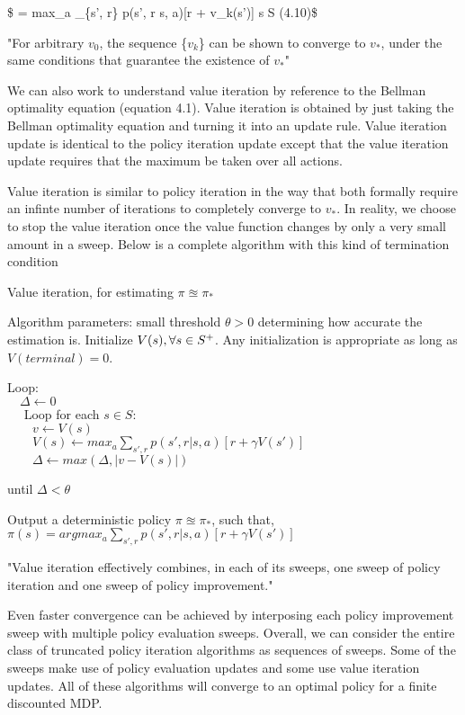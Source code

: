 \documentclass[11pt]{article}
\begin{document}
\$ \quad = max\_a \sum\_\{s', r\} p(s', r \textbar{} s, a){[}r +
\gamma v\_k(s'){]} \quad \forall \space s \in S \quad \quad (4.10)\$

"For arbitrary \(v_0\), the sequence \{\(v_k\)\} can be shown to
converge to \(v_*\), under the same conditions that guarantee the
existence of \(v_*\)"

    We can also work to understand value iteration by reference to the
Bellman optimality equation (equation 4.1). Value iteration is obtained
by just taking the Bellman optimality equation and turning it into an
update rule. Value iteration update is identical to the policy iteration
update except that the value iteration update requires that the maximum
be taken over all actions.

    Value iteration is similar to policy iteration in the way that both
formally require an infinte number of iterations to completely converge
to \(v_*\). In reality, we choose to stop the value iteration once the
value function changes by only a very small amount in a sweep. Below is
a complete algorithm with this kind of termination condition

    Value iteration, for estimating \(\pi \approxeq \pi_*\)

Algorithm parameters: small threshold \(\theta > 0\) determining how
accurate the estimation is. Initialize
\(V(s), \space \forall \space s \in S^+\). Any initialization is
appropriate as long as \(V(terminal) = 0\).

Loop:\\
\(\quad \Delta \leftarrow 0\)\\
\(\quad\) Loop for each \(s \in S\):\\
\(\quad \quad v \leftarrow V(s)\)\\
\(\quad \quad V(s) \leftarrow max_a\sum_{s', r} p(s', r | s, a)[r + \gamma V(s')]\)\\
\(\quad \quad \Delta \leftarrow max(\Delta, |v - V(s)|)\)

until \(\Delta < \theta\)

Output a deterministic policy \(\pi \approxeq \pi_*\), such that,\\
\(\pi(s) = argmax_a \sum_{s', r} p(s', r | s, a)[r + \gamma V(s')]\)

    "Value iteration effectively combines, in each of its sweeps, one sweep
of policy iteration and one sweep of policy improvement."

Even faster convergence can be achieved by interposing each policy
improvement sweep with multiple policy evaluation sweeps. Overall, we
can consider the entire class of truncated policy iteration algorithms
as sequences of sweeps. Some of the sweeps make use of policy evaluation
updates and some use value iteration updates. All of these algorithms
will converge to an optimal policy for a finite discounted MDP.
\end{document}
